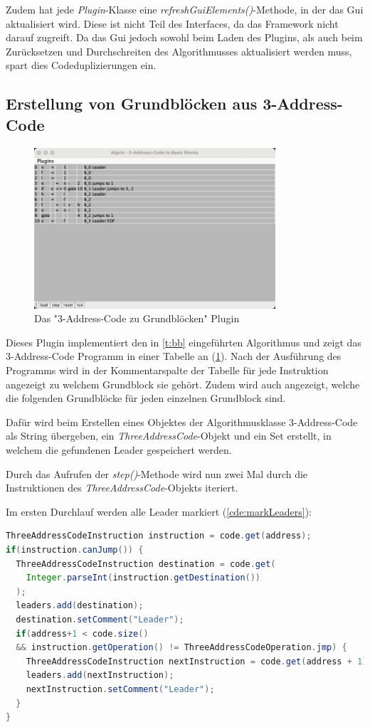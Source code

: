 Zudem hat jede \textit{Plugin}-Klasse eine \textit{refreshGuiElements()}-Methode,
in der das Gui aktualisiert wird. Diese ist nicht Teil des Interfaces, da
das Framework nicht darauf zugreift. Da das Gui jedoch sowohl beim Laden des Plugins, 
als auch beim Zurücksetzen und Durchschreiten des Algorithmusses aktualisiert werden muss,
spart dies Codeduplizierungen ein.






\subsection{Erstellung von Grundblöcken aus 3-Address-Code}
\begin{figure}[h]
  \centering
  \includegraphics[width=0.8\textwidth]{fig/Screenshot_TacToBb.png}
  \caption{Das "3-Address-Code zu Grundblöcken" Plugin}
  \label{sc:TACtoBB}
\end{figure}
Dieses Plugin implementiert den in \cref{t:bb} eingeführten Algorithmus
und zeigt das 3-Address-Code Programm in einer Tabelle an (\cref{sc:TACtoBB}). Nach der
Ausführung des Programms wird in der Kommentarspalte der Tabelle für jede
Instruktion angezeigt zu welchem Grundblock sie gehört. Zudem wird auch angezeigt,
welche die folgenden Grundblöcke für jeden einzelnen Grundblock sind.

Dafür wird beim Erstellen eines Objektes der Algorithmusklasse 3-Address-Code
als String übergeben, ein \textit{ThreeAddressCode}-Objekt und ein Set erstellt, 
in welchem die gefundenen Leader gespeichert werden.

Durch das Aufrufen der \textit{step()}-Methode wird nun zwei Mal durch die
Instruktionen des \textit{ThreeAddressCode}-Objekts iteriert.

\newpage
Im ersten Durchlauf werden alle Leader markiert (\cref{cde:markLeaders}):
\begin{lstlisting}[language=Java, caption={Markieren von Leadern}, label={cde:markLeaders}]
ThreeAddressCodeInstruction instruction = code.get(address);
if(instruction.canJump()) {
  ThreeAddressCodeInstruction destination = code.get(
    Integer.parseInt(instruction.getDestination())
  );
  leaders.add(destination);
  destination.setComment("Leader");
  if(address+1 < code.size() 
  && instruction.getOperation() != ThreeAddressCodeOperation.jmp) {
    ThreeAddressCodeInstruction nextInstruction = code.get(address + 1);
    leaders.add(nextInstruction);
    nextInstruction.setComment("Leader");
  }
}
\end{lstlisting}


